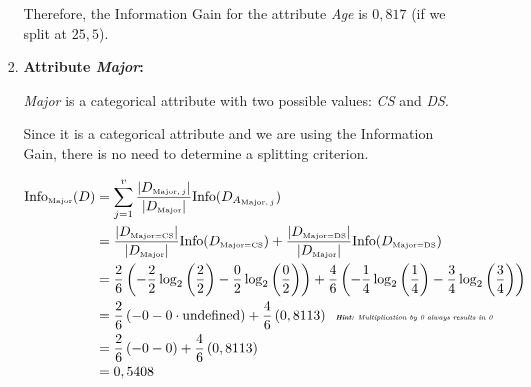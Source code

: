 \documentclass[
english,
smallborders
]{i6prcsht}
\newcommand{\OfSpecificValue}[3]{_{\text{\tiny #1#2#3}}}
\newcommand{\OfAttribute}[1]{_{\text{\tiny #1}}}
\begin{document}
\begin{solution}
\begin{enumerate}
\begin{enumerate}
\begin{enumerate}
\begin{enumerate}
		            \end{enumerate}

		            Therefore, the Information Gain for the attribute \textit{Age} is $0,817$ (if we split at $25,5$).

		      \item \textbf{Attribute \textit{Major}:}

		            \textit{Major} is a categorical attribute with two possible values: \textit{CS} and \textit{DS}.

		            Since it is a categorical attribute and we are using the Information Gain, there is no need to determine a splitting criterion.

		            \begin{alignat*}{2}
			            \text{Info}\OfAttribute{Major}(D) & = \sum_{j=1}^v \frac{|D\OfAttribute{Major$,j$}|}{|D\OfAttribute{Major}|} \text{Info}(D_{A\OfAttribute{Major$,j$}})                                                                                                                      \\
			                                              & = \frac{|D\OfSpecificValue{Major}{=}{CS}|}{|D\OfAttribute{Major}|} \text{Info}(D\OfSpecificValue{Major}{=}{CS}) + \frac{|D\OfSpecificValue{Major}{=}{DS}|}{|D\OfAttribute{Major}|} \text{Info}(D\OfSpecificValue{Major}{=}{DS})         \\
			                                              & = \frac{2}{6} \left(-\frac{2}{2} \log_2\left(\frac{2}{2}\right) - \frac{0}{2} \log_2\left(\frac{0}{2}\right)\right) + \frac{4}{6} \left(-\frac{1}{4} \log_2\left(\frac{1}{4}\right) - \frac{3}{4} \log_2\left(\frac{3}{4}\right)\right) \\
			                                              & = \frac{2}{6} \left(- 0 - 0 \cdot \text{undefined}\right) + \frac{4}{6} \left(0,8113\right) \text{\tiny \textit{\hspace{0,2cm}\textbf{Hint:} Multiplication by 0 always results in 0}}                                                  \\
			                                              & = \frac{2}{6} \left(- 0 - 0 \right) + \frac{4}{6} \left(0,8113\right)                                                                                                                                                                   \\
			                                              & = 0,5408                                                                                                                                                                                                                                \\

\end{alignat*}
\end{enumerate}
\end{enumerate}
\end{enumerate}
\end{solution}
\end{document}
